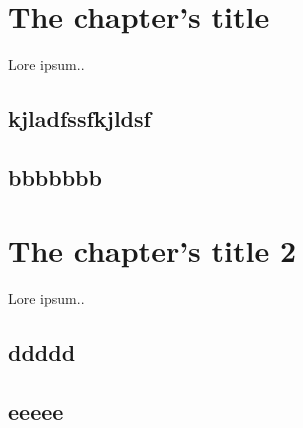 \chapter{The chapter's title }
Lore ipsum..

\section{kjladfssfkjldsf}
\section{bbbbbbb}


\chapter{The chapter's title 2}
Lore ipsum..

\section{ddddd}
\section{eeeee}



